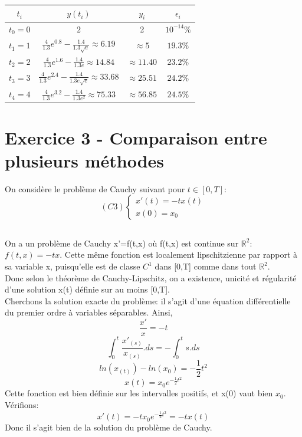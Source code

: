 \documentclass[a4paper,12pt,landscape]{article}
\begin{document}
\begin{table}[h]
\hspace{2cm}
\begin{tabular}{|c|c|c|c|}
\hline
	$t_i$ & $y(t_i)$ & $y_i$ & $\epsilon_i$ \\
\hline
	$t_0=0$ & $2$ & 2 & $10^{-14}\%$ \\
\hline
	$t_1=1$ & $\frac{4}{1.3}e^{0.8} -\frac{1.4}{1.3\sqrt{e}}\approx 6.19$ & $\approx 5$ & $19.3\%$ \\
\hline
	$t_2=2$ & $\frac{4}{1.3}e^{1.6} -\frac{1.4}{1.3e}\approx 14.84$ & $\approx 11.40$  & $23.2\%$ \\
\hline
	$t_3=3$ & $\frac{4}{1.3}e^{2.4} -\frac{1.4}{1.3e\sqrt{e}}\approx 33.68$& $\approx 25.51$ & $24.2\%$ \\
\hline
	$t_4=4$ & $\frac{4}{1.3}e^{3.2} -\frac{1.4}{1.3e^2}\approx 75.33$ & $ \approx 56.85$  & $24.5\%$ \\
\hline
\end{tabular}
\end{table}

\section{Exercice 3 - Comparaison entre plusieurs méthodes}
On considère le problème de Cauchy suivant pour $t\in [0,T]$:
$$
(C3) \left \{
\begin{array}{l}
	x'(t)= -tx(t) \\
	x(0) = x_0
\end{array}
\right.
$$
\subsection{}
On a un problème de Cauchy x'=f(t,x) où f(t,x) est continue sur $\mathbb{R}^2$: $f(t,x)=-tx$. Cette même fonction est localement lipschitzienne par rapport à sa variable x, puisqu'elle est de classe $C^1$ dans [0,T] comme dans tout $\mathbb{R}^2$.\\
Donc selon le théorème de Cauchy-Lipschitz, on a existence, unicité et régularité d'une solution x(t) définie sur au moins [0,T].\\

Cherchons la solution exacte du problème: il s'agit d'une équation différentielle du premier ordre à variables séparables. Ainsi,
$$\frac{x'}{x}=-t$$
$$\int_0^t\frac{x'_{(s)}}{x_{(s)}}.ds = - \int_0^t s.ds$$
$$ln(x_{(t)})-ln(x_0)=-\frac{1}{2}t^2$$
$$x(t)=x_0 e^{-\frac{1}{2}t^2}$$
Cette fonction est bien définie sur les intervalles positifs, et x(0) vaut bien $x_0$.
Vérifions:
$$x'(t)=-t x_0 e^{-\frac{1}{2}t^2}=-tx(t)$$
Donc il s'agit bien de la solution du problème de Cauchy.
\end{document}
